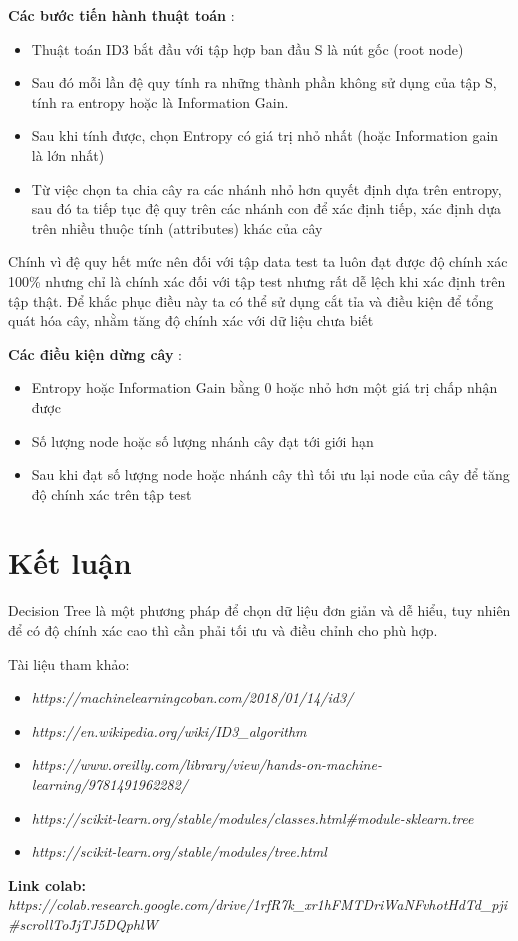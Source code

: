 \documentclass[lineno]{biometrika}
\begin{document}
\textbf{Các bước tiến hành thuật toán} : 

\begin{itemize}
    \item Thuật toán ID3 bắt đầu với tập hợp ban đầu S là nút gốc (root node)
    \item Sau đó mỗi lần đệ quy tính ra những thành phần không sử dụng của tập S, tính ra entropy hoặc là Information Gain. 
    \item Sau khi tính được, chọn Entropy có giá trị nhỏ nhất (hoặc Information gain là lớn nhất) 
    \item Từ việc chọn ta chia cây ra các nhánh nhỏ hơn quyết định dựa trên entropy, sau đó ta tiếp tục đệ quy trên các nhánh con để xác định tiếp, xác định dựa trên nhiều thuộc tính (attributes) khác của cây 
\end{itemize}

Chính vì đệ quy hết mức nên đối với tập data test ta luôn đạt được độ chính xác 100\% nhưng chỉ là chính xác đối với tập test nhưng rất dễ lệch khi xác định trên tập thật. Để khắc phục điều này ta có thể sử dụng cắt tỉa và điều kiện để tổng quát hóa cây, nhằm tăng độ chính xác với dữ liệu chưa biết 

\textbf{Các điều kiện dừng cây} :
\begin{itemize}
    \item Entropy hoặc Information Gain bằng 0 hoặc nhỏ hơn một giá trị chấp nhận được 
    \item Số lượng node hoặc số lượng nhánh cây đạt tới giới hạn 
    \item Sau khi đạt số lượng node hoặc nhánh cây thì tối ưu lại node của cây để tăng độ chính xác trên tập test 
\end{itemize}
\section{Kết luận} 
Decision Tree là một phương pháp để chọn dữ liệu đơn giản và dễ hiểu, tuy nhiên để có độ chính xác cao thì cần phải tối ưu và điều chỉnh cho phù hợp. 

Tài liệu tham khảo:
\begin{itemize}
    \item \em https://machinelearningcoban.com/2018/01/14/id3/
    \item \em https://en.wikipedia.org/wiki/ID3\_algorithm
    \item \em https://www.oreilly.com/library/view/hands-on-machine-learning/9781491962282/
    \item \em https://scikit-learn.org/stable/modules/classes.html#module-sklearn.tree
    \item \em https://scikit-learn.org/stable/modules/tree.html
\end{itemize}
\textbf{Link colab:} \em https://colab.research.google.com/drive/1rfR7k\_xr1hFMTDriWaNFvhotHdTd\_pji\#scrollTo\=JjTJ5D\-QphlW
\end{document}
